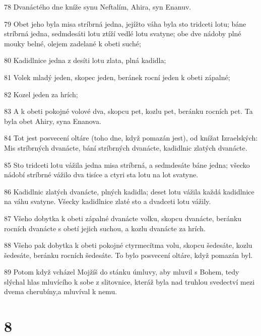\par 78 Dvanáctého dne kníže synu Neftalím, Ahira, syn Enanuv.
\par 79 Obet jeho byla misa stríbrná jedna, jejížto váha byla sto tridceti lotu; báne stríbrná jedna, sedmdesáti lotu ztíží vedlé lotu svatyne; obe dve nádoby plné mouky belné, olejem zadelané k obeti suché;
\par 80 Kadidlnice jedna z desíti lotu zlata, plná kadidla;
\par 81 Volek mladý jeden, skopec jeden, beránek rocní jeden k obeti zápalné;
\par 82 Kozel jeden za hrích;
\par 83 A k obeti pokojné volové dva, skopcu pet, kozlu pet, beránku rocních pet. Ta byla obet Ahiry, syna Enanova.
\par 84 Tot jest posvecení oltáre (toho dne, když pomazán jest), od knížat Izraelských: Mis stríbrných dvanácte, bání stríbrných dvanácte, kadidlnic zlatých dvanácte.
\par 85 Sto tridceti lotu vážila jedna misa stríbrná, a sedmdesáte báne jedna; všecko nádobí stríbrné vážilo dva tisíce a ctyri sta lotu na lot svatyne.
\par 86 Kadidlnic zlatých dvanácte, plných kadidla; deset lotu vážila každá kadidlnice na váhu svatyne. Všecky kadidlnice zlaté sto a dvadceti lotu vážily.
\par 87 Všeho dobytka k obeti zápalné dvanácte volku, skopcu dvanácte, beránku rocních dvanácte s obetí jejich suchou, a kozlu dvanácte za hrích.
\par 88 Všeho pak dobytka k obeti pokojné ctyrmecítma volu, skopcu šedesáte, kozlu šedesáte, beránku rocních šedesáte. To bylo posvecení oltáre, když pomazán byl.
\par 89 Potom když vcházel Mojžíš do stánku úmluvy, aby mluvil s Bohem, tedy slýchal hlas mluvícího k sobe z slitovnice, kteráž byla nad truhlou svedectví mezi dvema cherubíny,a mluvíval k nemu.

\chapter{8}


